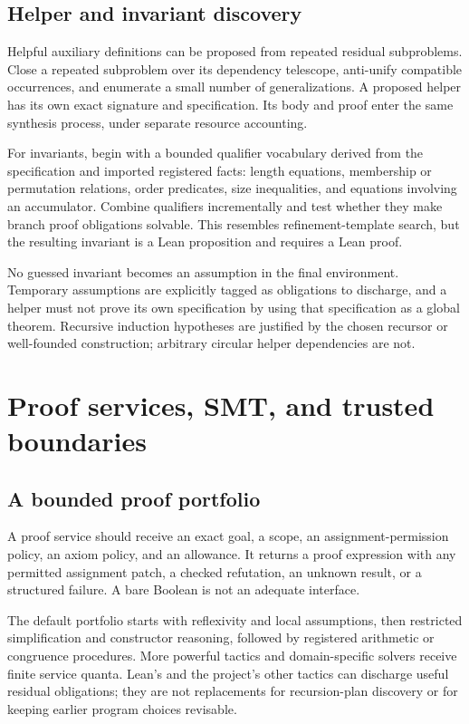 \documentclass[11pt,letterpaper]{article}
\newcommand{\id}[1]{\texttt{\detokenize{#1}}}
\theoremstyle{definition}
\theoremstyle{remark}
\begin{document}
\subsection{Helper and invariant discovery}

Helpful auxiliary definitions can be proposed from repeated residual subproblems. Close a repeated subproblem over its dependency telescope, anti-unify compatible occurrences, and enumerate a small number of generalizations. A proposed helper has its own exact signature and specification. Its body and proof enter the same synthesis process, under separate resource accounting.

For invariants, begin with a bounded qualifier vocabulary derived from the specification and imported registered facts: length equations, membership or permutation relations, order predicates, size inequalities, and equations involving an accumulator. Combine qualifiers incrementally and test whether they make branch proof obligations solvable. This resembles refinement-template search, but the resulting invariant is a Lean proposition and requires a Lean proof.

No guessed invariant becomes an assumption in the final environment. Temporary assumptions are explicitly tagged as obligations to discharge, and a helper must not prove its own specification by using that specification as a global theorem. Recursive induction hypotheses are justified by the chosen recursor or well-founded construction; arbitrary circular helper dependencies are not.

\section{Proof services, SMT, and trusted boundaries}
\label{sec:proof}

\subsection{A bounded proof portfolio}

A proof service should receive an exact goal, a scope, an assignment-permission policy, an axiom policy, and an allowance. It returns a proof expression with any permitted assignment patch, a checked refutation, an unknown result, or a structured failure. A bare Boolean is not an adequate interface.

The default portfolio starts with reflexivity and local assumptions, then restricted simplification and constructor reasoning, followed by registered arithmetic or congruence procedures. More powerful tactics and domain-specific solvers receive finite service quanta. Lean's \id{grind} and the project's other tactics can discharge useful residual obligations; they are not replacements for recursion-plan discovery or for keeping earlier program choices revisable.
\end{document}
